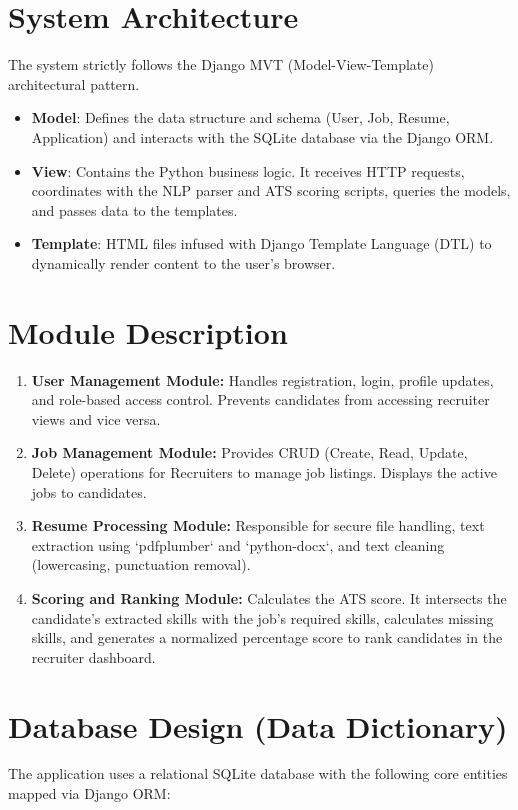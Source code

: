 \documentclass[12pt,a4paper]{report}
\begin{document}
\section{System Architecture}
The system strictly follows the Django MVT (Model-View-Template) architectural pattern. 
\begin{itemize}
\item \textbf{Model}: Defines the data structure and schema (User, Job, Resume, Application) and interacts with the SQLite database via the Django ORM.
\item \textbf{View}: Contains the Python business logic. It receives HTTP requests, coordinates with the NLP parser and ATS scoring scripts, queries the models, and passes data to the templates.
\item \textbf{Template}: HTML files infused with Django Template Language (DTL) to dynamically render content to the user's browser.
\end{itemize}

\section{Module Description}
\begin{enumerate}
\item \textbf{User Management Module:} Handles registration, login, profile updates, and role-based access control. Prevents candidates from accessing recruiter views and vice versa.
\item \textbf{Job Management Module:} Provides CRUD (Create, Read, Update, Delete) operations for Recruiters to manage job listings. Displays the active jobs to candidates.
\item \textbf{Resume Processing Module:} Responsible for secure file handling, text extraction using `pdfplumber` and `python-docx`, and text cleaning (lowercasing, punctuation removal).
\item \textbf{Scoring and Ranking Module:} Calculates the ATS score. It intersects the candidate's extracted skills with the job's required skills, calculates missing skills, and generates a normalized percentage score to rank candidates in the recruiter dashboard.
\end{enumerate}

\section{Database Design (Data Dictionary)}
The application uses a relational SQLite database with the following core entities mapped via Django ORM:
\end{document}
